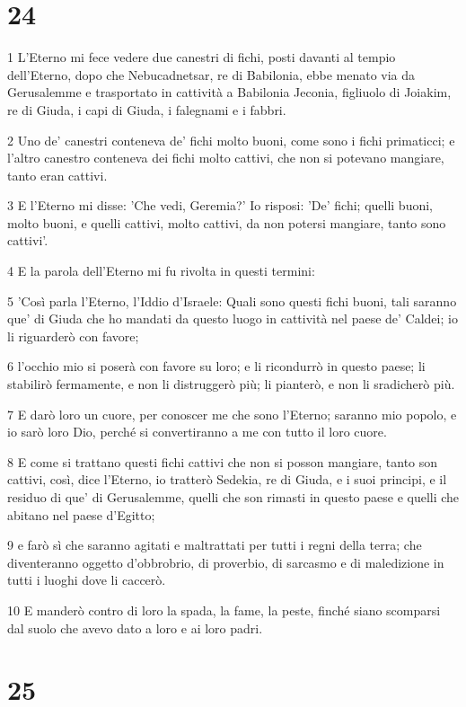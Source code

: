 \chapter{24}

\par 1 L'Eterno mi fece vedere due canestri di fichi, posti davanti al tempio dell'Eterno, dopo che Nebucadnetsar, re di Babilonia, ebbe menato via da Gerusalemme e trasportato in cattività a Babilonia Jeconia, figliuolo di Joiakim, re di Giuda, i capi di Giuda, i falegnami e i fabbri.
\par 2 Uno de' canestri conteneva de' fichi molto buoni, come sono i fichi primaticci; e l'altro canestro conteneva dei fichi molto cattivi, che non si potevano mangiare, tanto eran cattivi.
\par 3 E l'Eterno mi disse: 'Che vedi, Geremia?' Io risposi: 'De' fichi; quelli buoni, molto buoni, e quelli cattivi, molto cattivi, da non potersi mangiare, tanto sono cattivi'.
\par 4 E la parola dell'Eterno mi fu rivolta in questi termini:
\par 5 'Così parla l'Eterno, l'Iddio d'Israele: Quali sono questi fichi buoni, tali saranno que' di Giuda che ho mandati da questo luogo in cattività nel paese de' Caldei; io li riguarderò con favore;
\par 6 l'occhio mio si poserà con favore su loro; e li ricondurrò in questo paese; li stabilirò fermamente, e non li distruggerò più; li pianterò, e non li sradicherò più.
\par 7 E darò loro un cuore, per conoscer me che sono l'Eterno; saranno mio popolo, e io sarò loro Dio, perché si convertiranno a me con tutto il loro cuore.
\par 8 E come si trattano questi fichi cattivi che non si posson mangiare, tanto son cattivi, così, dice l'Eterno, io tratterò Sedekia, re di Giuda, e i suoi principi, e il residuo di que' di Gerusalemme, quelli che son rimasti in questo paese e quelli che abitano nel paese d'Egitto;
\par 9 e farò sì che saranno agitati e maltrattati per tutti i regni della terra; che diventeranno oggetto d'obbrobrio, di proverbio, di sarcasmo e di maledizione in tutti i luoghi dove li caccerò.
\par 10 E manderò contro di loro la spada, la fame, la peste, finché siano scomparsi dal suolo che avevo dato a loro e ai loro padri.

\chapter{25}

